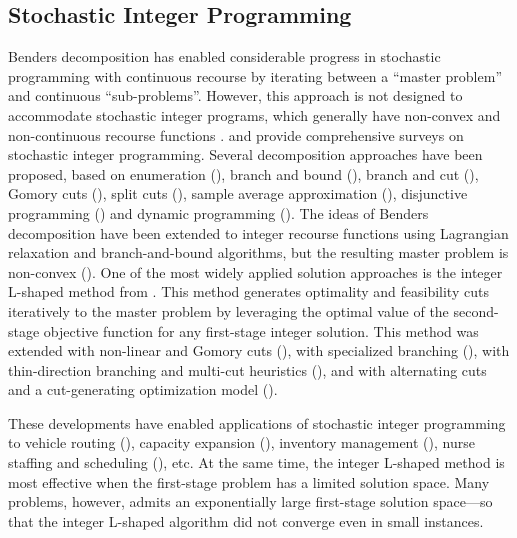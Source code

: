 \documentclass{article}
\theoremstyle{plain}
\theoremstyle{definition}
\begin{document}
\subsection{Stochastic Integer Programming}
Benders decomposition has enabled considerable progress in stochastic programming with continuous recourse \cite{Benders 1962} by iterating between a “master problem” and continuous “sub-problems”. However, this approach is not designed to accommodate stochastic integer programs, which generally have non-convex and non-continuous recourse functions \cite{Schultz 1993}. \cite{Louveaux and Schultz (2003)} and \cite{Sen (2005)} provide comprehensive surveys on stochastic integer programming. Several decomposition approaches have been proposed, based on enumeration (\cite{Schultz et al. 1998}), branch and bound (\cite{Ahmed et al. 2004}), branch and cut (\cite{Sen and Sherali 2006}), Gomory cuts (\cite{Zhang and Kucukyavuz 2014}), split cuts (\cite{Sen and Higle 2005}), sample average approximation (\cite{Kleywegt et al. 2001}), disjunctive programming (\cite{Ntaimo 2010}) and dynamic programming (\cite{Zou et al. 2017}). The ideas of Benders decomposition have been extended to integer recourse functions using Lagrangian relaxation and branch-and-bound algorithms, but the resulting master problem is non-convex (\cite{Caroe and Schultz 1997}). One of the most widely applied solution approaches is the integer L-shaped method from \cite{Laporte and Louveaux (1993)}. This method generates optimality and feasibility cuts iteratively to the master problem by leveraging the optimal value of the second-stage objective function for any first-stage integer solution. This method was extended with non-linear and Gomory cuts (\cite{Caroe and Schultz 1999}), with specialized branching (\cite{Ahmed et al. 2004}), with thin-direction branching and multi-cut heuristics (\cite{Kim and Mehrotra 2015}), and with alternating cuts and a cut-generating optimization model (\cite{Angulo et al. 2016}).

These developments have enabled applications of stochastic integer programming to vehicle routing (\cite{Laporte et al. 2002}), capacity expansion (\cite{Ahmed and Sahinidis 2003}), inventory management (\cite{Gunpinar and Centeno 2015}), nurse staffing and scheduling (\cite{Kim and Mehrotra 2015}), etc. At the same time, the integer L-shaped method is most effective when the first-stage problem has a limited solution space. Many problems, however, admits an exponentially large first-stage solution space—so that the integer L-shaped algorithm did not converge even in small instances.
\end{document}
